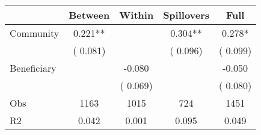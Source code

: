 
\begin{tabular}{l*{4}{c}}\hline&\multicolumn{1}{c}{Between}&\multicolumn{1}{c}{Within}&\multicolumn{1}{c}{Spillovers}&\multicolumn{1}{c}{Full}\\ \hline
 Community             &              0.221**      &                                               &        0.304** &         0.278*                            \\ 
                               &        (       0.081)           &                                       &       (       0.096)     &      (       0.099)                                           \\ 
 Beneficiary   &                                               &       -0.080    &                                &            -0.050                            \\ 
                               &                                               & (       0.069)                  &                                        &      (       0.080)                                           \\ 
\hline                                                                                                                                                                                                                                            
 Obs                   &               1163               &       1015                       &       724                &              1451                                               \\ 
 R2                    &                      0.042              &              0.001                      &              0.095               &                     0.049                                              \\ 
\hline \end{tabular}                                                                                                                                                                                                              